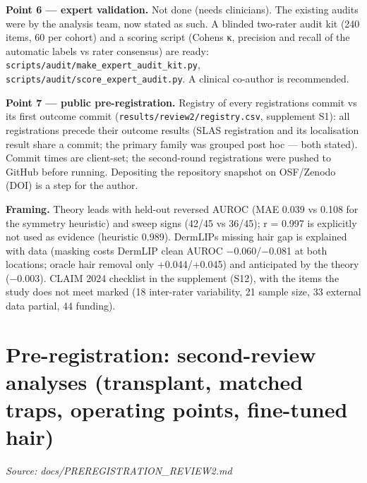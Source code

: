 {\textbf{Point 6 --- expert validation.} Not done (needs clinicians). The existing audits were by the analysis team, now
stated as such. A blinded two-rater audit kit (240 items, 60 per cohort) and a scoring script (Cohen\textquotesingle s κ, precision
and recall of the automatic labels vs rater consensus) are ready: \texttt{scripts/audit/make\_expert\_audit\_kit.py},
\texttt{scripts/audit/score\_expert\_audit.py}. A clinical co-author is recommended.

\textbf{Point 7 --- public pre-registration.} Registry of every registration\textquotesingle s commit vs its first outcome commit
(\texttt{results/review2/registry.csv}, supplement S1): all registrations precede their outcome results (SLAS registration
and its localisation result share a commit; the primary family was grouped post hoc --- both stated). Commit times are
client-set; the second-round registrations were pushed to GitHub before running. Depositing the repository snapshot
on OSF/Zenodo (DOI) is a step for the author.

\textbf{Framing.} Theory leads with held-out reversed AUROC (MAE 0.039 vs 0.108 for the symmetry heuristic) and sweep signs
(42/45 vs 36/45); r = 0.997 is explicitly not used as evidence (heuristic 0.989). DermLIP\textquotesingle s missing hair gap is
explained with data (masking costs DermLIP clean AUROC −0.060/−0.081 at both locations; oracle hair removal only
+0.044/+0.045) and anticipated by the theory (−0.003). CLAIM 2024 checklist in the supplement (S12), with the items the
study does not meet marked (18 inter-rater variability, 21 sample size, 33 external data partial, 44 funding).

}

\section{Pre-registration: second-review analyses (transplant, matched traps, operating points, fine-tuned hair)}\label{doc:PREREGISTRATION_REVIEW2}
\noindent\textit{Source: docs/PREREGISTRATION\_REVIEW2.md}

